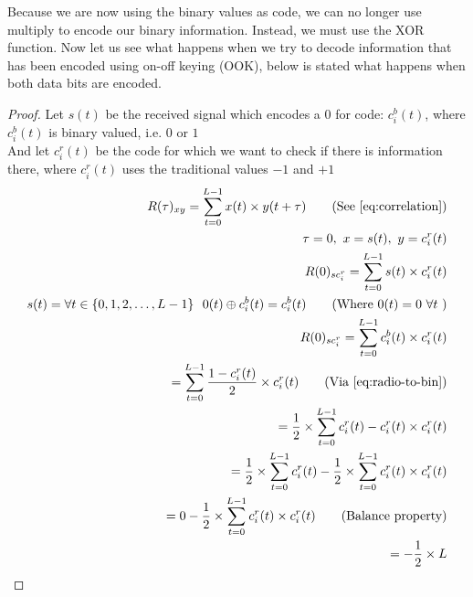 		Because we are now using the binary values as code, we can no longer use multiply to encode our binary information.
		Instead, we must use the XOR function.
		Now let us see what happens when we try to decode information that has been encoded using on-off keying (OOK), below is stated what happens when both data bits are encoded.

		\begin{proof}
			Let $s(t)$ be the received signal which encodes a 0 for code: $c^b_i(t)$, where $c^b_i(t)$ is binary valued, i.e. $0$ or $1$ \\
			And let $c^r_i(t)$ be the code for which we want to check if there is information there, where $c^r_i(t)$ uses the traditional values $-1$ and $+1$ \\

			\begin{align*}
				R(\tau)_{xy} = \displaystyle\sum_{t = 0} ^ {L - 1} x(t) \times y(t + \tau)	\tag{See \autoref{eq:correlation}}
				\\ \tau = 0,\ x = s(t),\ y = c^r_i(t)	
				\\ R(0)_{sc^r_{i}} = \displaystyle\sum_{t = 0} ^ {L - 1} s(t) \times c^r_i(t)	
				\\ s(t) = \forall t \in \{ 0, 1, 2, \dotsc, L - 1 \} \ \ 0(t) \oplus c^b_i(t) = c^b_i(t) \tag{Where $0(t) = 0 \ \forall t$ }										
				\\ R(0)_{sc^r_{i}} = \displaystyle\sum_{t = 0} ^ {L - 1} c^b_i(t) \times c^r_i(t)
				\\ = \displaystyle\sum_{t = 0} ^ {L - 1} \frac{1 - c^r_i(t)}{2} \times c^r_i(t) \tag{Via \autoref{eq:radio-to-bin}}
				\\ = \frac{1}{2} \times \displaystyle\sum_{t = 0} ^ {L - 1} c^r_i(t) - c^r_i(t) \times c^r_i(t)
				\\ = \frac{1}{2} \times \displaystyle\sum_{t = 0} ^ {L - 1} c^r_i(t) - \frac{1}{2} \times \displaystyle\sum_{t = 0} ^ {L - 1} c^r_i(t) \times c^r_i(t)
				\\ = 0 - \frac{1}{2} \times \displaystyle\sum_{t = 0} ^ {L - 1} c^r_i(t) \times c^r_i(t) \tag{Balance property}
				\\ = - \frac{1}{2} \times L
			\end{align*}

		\end{proof}

